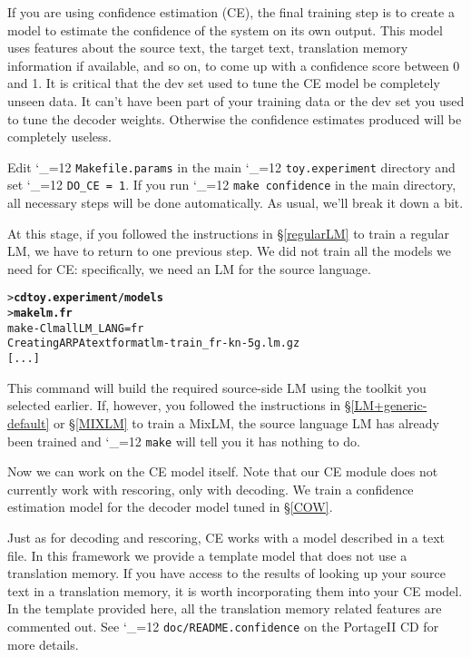 \documentclass[11pt,letterpaper]{article}
\newcommand{\PS}{PortageII\xspace}
\def\code{\begingroup\catcode`\_=12 \codex}
\newcommand{\codex}[1]{\texttt{#1}\endgroup}
\begin{document}
If you are using confidence estimation (CE), the final training step is
to create a model to estimate the confidence of the system on its own output.
This model uses features about the source text, the target text, translation
memory information if available, and so on, to come up with a confidence score
between 0 and 1. It is critical that the dev set used to
tune the CE model be completely unseen data. It can't have been part of your
training data or the dev set you used to tune the decoder weights.  Otherwise
the confidence estimates produced will be completely useless.

Edit \code{Makefile.params} in the main \code{toy.experiment} directory and set
\code{DO_CE = 1}.  If you run
\code{make confidence} in the main directory, all necessary steps will be done
automatically.  As usual, we'll break it down a bit.

At this stage, if you followed the instructions in \S\ref{regularLM} to train a
regular LM, we have to return to one previous step.  We did not train all the
models we need for CE: specifically, we need an LM for the source language.

\begin{small}
\begin{alltt}
   > \textbf{cd toy.experiment/models}
   > \textbf{make lm.fr}
   make -C lm all LM_LANG=fr
   Creating ARPA text format lm-train_fr-kn-5g.lm.gz
   [...]
\end{alltt}
\end{small}
This command will build the required source-side LM using the toolkit you
selected earlier.  If, however, you followed the instructions in
\S\ref{LM+generic-default} or \S\ref{MIXLM} to train a MixLM, the source language
LM has already been trained and \code{make} will tell you it has nothing to do.

Now we can work on the CE model itself. Note that our CE module does not
currently work with rescoring, only with decoding. We train a confidence
estimation model for the decoder model tuned in \S\ref{COW}.

Just as for decoding and rescoring, CE works with a model described in a text
file.  In this framework we provide a template model that does not use a
translation memory.  If you have access to the results of looking up your
source text in a translation memory, it is worth incorporating them into your
CE model.  In the template provided here, all the translation memory related
features are commented out.  See \code{doc/README.confidence} on the \PS CD for
more details.
\end{document}
